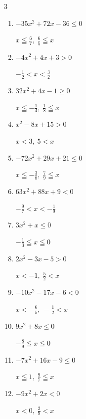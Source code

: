\begin{multicols}{3}
\begin{enumerate}
        $\displaystyle x < 0 , \; \frac{7}{3} < x$

  \item $-35x^{2}+72x-36\leq 0$

        $\displaystyle x \leqq \frac{6}{7} , \; \frac{6}{5} \leqq x$

  \item $-4x^{2}+4x+3>0$

        $\displaystyle -\frac{1}{2} < x < \frac{3}{2}$

  \item $32x^{2}+4x-1\geq 0$

        $\displaystyle x \leqq -\frac{1}{4} , \; \frac{1}{8} \leqq x$

  \item $x^{2}-8x+15>0$

        $\displaystyle x < 3 , \; 5 < x$

  \item $-72x^{2}+29x+21\leq 0$

        $\displaystyle x \leqq -\frac{3}{8} , \; \frac{7}{9} \leqq x$

  \item $63x^{2}+88x+9<0$

        $\displaystyle -\frac{9}{7} < x < -\frac{1}{9}$

  \item $3x^{2}+x\leq 0$

        $\displaystyle -\frac{1}{3} \leqq x \leqq 0$

\columnbreak %

  \item $2x^{2}-3x-5>0$

        $\displaystyle x < -1 , \; \frac{5}{2} < x$

  \item $-10x^{2}-17x-6<0$

        $\displaystyle x < -\frac{6}{5} , \; -\frac{1}{2} < x$

  \item $9x^{2}+8x\leq 0$

        $\displaystyle -\frac{8}{9} \leqq x \leqq 0$

  \item $-7x^{2}+16x-9\leq 0$

        $\displaystyle x \leqq 1 , \; \frac{9}{7} \leqq x$

  \item $-9x^{2}+2x<0$

        $\displaystyle x < 0 , \; \frac{2}{9} < x$


\end{enumerate}
\end{multicols}

